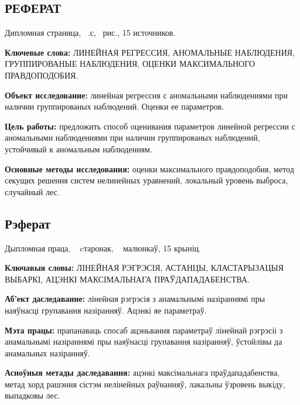 \begin{center}
    \section*{РЕФЕРАТ}
\end{center}

Дипломная страница, ~.с, ~рис., 15 источников.

\textbf{Ключевые слова:} ЛИНЕЙНАЯ РЕГРЕССИЯ, АНОМАЛЬНЫЕ НАБЛЮДЕНИЯ, ГРУППИРОВАНЫЕ НАБЛЮДЕНИЯ, ОЦЕНКИ МАКСИМАЛЬНОГО ПРАВДОПОДОБИЯ.

\textbf{Объект исследование:} линейная регрессия с аномальными наблюдениями при наличии группированых наблюдений. Оценки ее параметров.

\textbf{Цель работы:} предложить способ оценивания параметров линейной регрессии с аномальными наблюдениями при наличии группированых наблюдений, устойчивый к аномальным наблюдениям.

\textbf{Основные методы исследования:} оценки максимального правдоподобия, метод секущих решения систем нелинейных уравнений, локальный уровень выброса, случайный лес.

\newpage

\begin{otherlanguage}{belarusian}

\begin{center}
    \section*{Рэферат}
\end{center}
Дыпломная праца, ~ cтаронак, ~ малюнкаў, 15 крыніц.

\textbf{Ключавыя словы:}  ЛІНЕЙНАЯ РЭГРЭСІЯ, АСТАНЦЫ, КЛАСТАРЫЗАЦЫЯ ВЫБАРКІ, АЦЭНКІ МАКСІМАЛЬНАГА ПРАЎДАПАДАБЕНСТВА.

\textbf{Аб'ект даследаванне:} лінейная рэгрэсія з анамальнымі назіраннямі пры наяўнасці групавання назіранняў. Ацэнкі яе параметраў.

\textbf{Мэта працы:} прапанаваць спосаб ацэньвання параметраў лінейнай рэгрэсіі з анамальнымі назіраннямі пры наяўнасці групавання назіранняў, ўстойлівы да анамальных назіранняў.

\textbf{Асноўныя метады даследавання:} ацэнкі максімальнага праўдападабенства, метад хорд рашэння сістэм нелінейных раўнанняў, лакальны ўзровень выкіду, выпадковы лес.

\end{otherlanguage}

